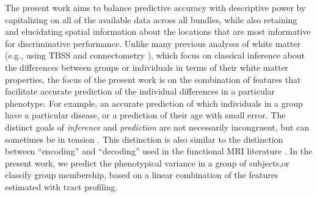 \documentclass[10pt,letterpaper]{article}
\begin{document}



The present work aims to balance predictive accuracy with descriptive power
\cite{Murdoch2019-ax, Breiman2001-uz} by capitalizing on all of the available
data across all bundles, while also retaining and elucidating spatial
information about the locations that are most informative for discriminative
performance.
Unlike many previous analyses of white matter (e.g., using TBSS \cite{smith2006tract} and connectometry \cite{yeh2016connectometry}), which focus on classical inference about the differences between groups or individuals in terms of their white matter properties, the focus of the present work is on the combination of features that facilitate accurate prediction of the individual differences in a particular phenotype.
For example, an accurate prediction of which individuals in a group have a particular disease, or a prediction of their age with small error. The distinct goals of \emph{inference} and \emph{prediction} are not necessarily incongruent, but can sometimes be in tension \cite{Bzdok2020-sd}. This distinction is also similar to the distinction between ``encoding'' and ``decoding'' used in the functional MRI literature \cite{Naselaris2011-ss}. In the present work, we predict the phenotypical variance in a group of subjects,or classify group membership, based on a linear combination of the features estimated with tract profiling.
\end{document}
